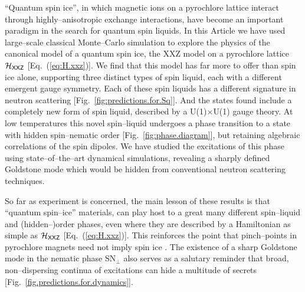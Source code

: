 \documentclass[apsrev4-1,prx,superscriptaddress,floatfix,twocolumn,longbibliography]{revtex4-1}
\begin{document}
``Quantum spin ice'', in which magnetic ions on a pyrochlore lattice interact through 
highly--anisotropic exchange interactions, have become an important paradigm in 
the search for quantum spin liquids.
%
In this Article we have used large--scale classical
Monte--Carlo simulation to explore the physics of the canonical 
model of a quantum spin ice,  
the XXZ model on a pyrochlore lattice $\mathcal{H}_{\sf XXZ}$ 
[Eq.~(\ref{eq:H.xxz})].
%
We find that this model has far more to offer than spin ice alone, supporting 
three distinct types of spin liquid, each with a different emergent gauge symmetry.
%
Each of these spin liquids has a different signature in neutron 
scattering [Fig.~\ref{fig:predictions.for.Sq}].
%
And the states found include a completely new form 
of spin liquid, described by a U(1)$\times$U(1) gauge theory.
%
At low temperatures this novel spin--liquid undergoes a phase transition to a state with 
hidden spin--nematic order [Fig.~\ref{fig:phase.diagram}], but retaining algebraic
correlations of the spin dipoles.
%
We have studied the excitations of this phase using state--of--the--art dynamical
simulations, revealing a sharply defined Goldstone mode which would be 
hidden from conventional neutron scattering techniques.


So far as experiment is concerned, the main lesson 
of these results is that ``quantum spin--ice'' materials, 
can play host to a great many different spin--liquid and (hidden--)order 
phases, even where they are described by a Hamiltonian as simple as 
$\mathcal{H}_{\sf XXZ}$ [Eq.~(\ref{eq:H.xxz})].  
%
This reinforces the point that pinch--points in pyrochlore magnets
need not imply spin ice \cite{henley10,benton16-NatCommun7}.  
%
The existence of a sharp Goldstone mode in the nematic phase $\text{SN}_\perp$
also serves as a salutary reminder that broad, non--dispersing continua of 
excitations can hide a multitude of secrets [Fig.~\ref{fig.predictions.for.dynamics}].

\end{document}
